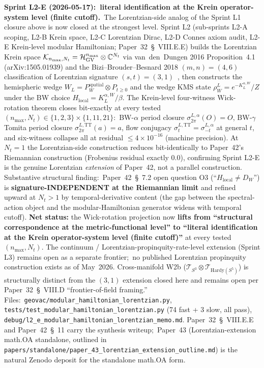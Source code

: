 \documentclass[11pt]{article}
\begin{document}
\textbf{Sprint L2-E (2026-05-17):\ literal identification at the Krein
operator-system level (finite cutoff).}\ The Lorentzian-side analog of
the Sprint L1 closure above is now closed at the strongest level.
Sprint L2 (sub-sprints L2-A scoping, L2-B Krein space, L2-C Lorentzian
Dirac, L2-D Connes axiom audit, L2-E Krein-level modular Hamiltonian;
Paper~32~\S~VIII.E.E) builds the Lorentzian Krein space
$\mathcal{K}_{n_{\max}, N_t} = \mathcal{H}_{\rm GV}^{n_{\max}} \otimes
\mathbb{C}^{N_t}$ via van~den~Dungen 2016 Proposition~4.1
(arXiv:1505.01939) and the Bizi--Brouder--Besnard 2018
$(m, n) = (4, 6)$ classification of Lorentzian signature
$(s, t) = (3, 1)$~\cite{bizi_brouder_besnard2018}, then constructs the
hemispheric wedge $W_L = P_W^{\mathrm{spatial}} \otimes P_{t \geq 0}$
and the wedge KMS state $\rho_W^L = e^{-K_L^{\alpha, W}}/Z$ under the
BW choice $H_{\mathrm{local}} = K_L^{\alpha, W}/\beta$.  The
Krein-level four-witness Wick-rotation theorem closes bit-exactly at
every tested $(n_{\max}, N_t) \in \{1, 2, 3\} \times \{1, 11, 21\}$:\
BW-$\alpha$ period closure $\sigma_{2\pi}^{L, \alpha}(O) = O$, BW-$\gamma$
Tomita period closure $\sigma_{2\pi}^{L, \mathrm{TT}}(a) = a$, flow
conjugacy $\sigma_t^{L, \mathrm{TT}} = \sigma_{-t}^{L, \alpha}$ at
general $t$, and six-witness collapse all at residual $\leq 4 \times
10^{-16}$ (machine precision).  At $N_t = 1$ the Lorentzian-side
construction reduces bit-identically to Paper~42's Riemannian
construction (Frobenius residual exactly $0.0$), confirming Sprint L2-E
is the genuine Lorentzian \emph{extension} of Paper~42, not a parallel
construction.  Substantive structural finding:\ Paper~42~\S~7.2 open
question O3 (``$H_{\mathrm{local}} \neq D_W$'') is
\textbf{signature-INDEPENDENT at the Riemannian limit} and refined
upward at $N_t > 1$ by temporal-derivative content (the gap between
the spectral-action object and the modular-Hamiltonian generator
widens with temporal cutoff).  \textbf{Net status:} the Wick-rotation
projection now \textbf{lifts from ``structural correspondence at the
metric-functional level'' to ``literal identification at the Krein
operator-system level (finite cutoff)''} at every tested
$(n_{\max}, N_t)$.  The continuum / Lorentzian-propinquity-rate-level
extension (Sprint L3) remains open as a separate frontier;\ no
published Lorentzian propinquity construction exists as of
May~2026.  Cross-manifold W2b
($\mathcal{T}_{S^3} \otimes \mathcal{T}_{\mathrm{Hardy}(S^5)}$) is
structurally distinct from the $(3, 1)$ extension closed here and
remains open per Paper~32~\S~VIII.D ``frontier-of-field framing.''
Files:\ \verb|geovac/modular_hamiltonian_lorentzian.py|,
\verb|tests/test_modular_hamiltonian_lorentzian.py| (74 fast + 3 slow,
all pass), \verb|debug/l2_e_modular_hamiltonian_lorentzian_memo.md|.
Paper~32~\S~VIII.E.E and Paper~42~\S~11 carry the synthesis
writeup;\ Paper~43 (Lorentzian-extension math.OA standalone, outlined
in \texttt{papers/standalone/paper\_43\_lorentzian\_extension\_outline.md})
is the natural Zenodo deposit for the standalone math.OA form.
\end{document}
